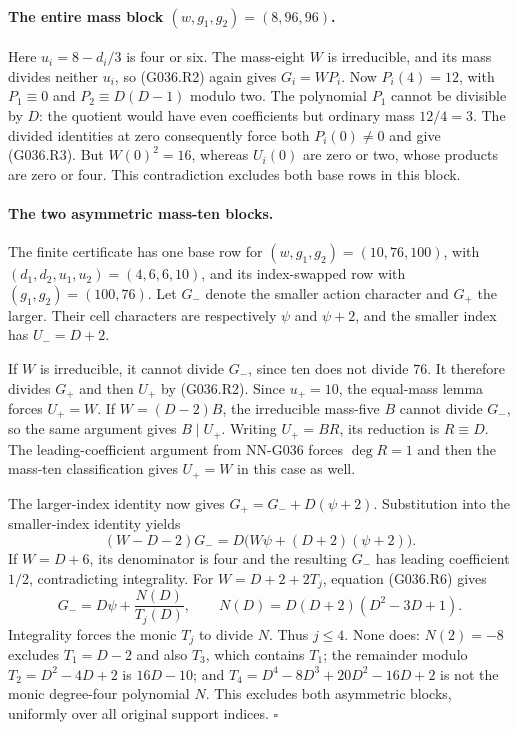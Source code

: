 \paragraph{The entire mass block $(w,g_1,g_2)=(8,96,96)$.}
Here $u_i=8-d_i/3$ is four or six.
The mass-eight $W$ is irreducible, and its mass
divides neither $u_i$, so (G036.R2) again gives
$G_i=WP_i$. Now $P_i(4)=12$, with
$P_1\equiv0$ and $P_2\equiv D(D-1)$ modulo two.
The polynomial $P_1$ cannot be divisible by $D$:
the quotient would have even coefficients but
ordinary mass $12/4=3$.
The divided identities at zero consequently
force both $P_i(0)\ne0$ and give (G036.R3).
But $W(0)^2=16$, whereas $U_i(0)$ are zero or two,
whose products are zero or four. This contradiction
excludes both base rows in this block.

\paragraph{The two asymmetric mass-ten blocks.}
The finite certificate has one base row for
$(w,g_1,g_2)=(10,76,100)$, with
$(d_1,d_2,u_1,u_2)=(4,6,6,10)$, and its index-swapped
row with $(g_1,g_2)=(100,76)$.
Let $G_-$ denote the smaller action character and
$G_+$ the larger. Their cell characters are
respectively $\psi$ and $\psi+2$, and the smaller
index has $U_-=D+2$.

If $W$ is irreducible, it cannot divide $G_-$,
since ten does not divide $76$.
It therefore divides $G_+$ and then $U_+$ by
(G036.R2). Since $u_+=10$, the equal-mass lemma
forces $U_+=W$.
If $W=(D-2)B$, the irreducible mass-five $B$ cannot
divide $G_-$, so the same argument gives $B\mid U_+$.
Writing $U_+=BR$, its reduction is $R\equiv D$.
The leading-coefficient argument from NN-G036 forces
$\deg R=1$ and then the mass-ten classification gives
$U_+=W$ in this case as well.

The larger-index identity now gives
$G_+=G_-+D(\psi+2)$.
Substitution into the smaller-index identity yields
\[
 (W-D-2)G_-=D\bigl(W\psi+(D+2)(\psi+2)\bigr).       \tag{G036.R6}
\]
If $W=D+6$, its denominator is four and the resulting
$G_-$ has leading coefficient $1/2$, contradicting
integrality.
For $W=D+2+2T_j$, equation (G036.R6) gives
\[
 G_-=D\psi+\frac{N(D)}{T_j(D)},\qquad
 N(D)=D(D+2)(D^2-3D+1).
\]
Integrality forces the monic $T_j$ to divide $N$.
Thus $j\le4$. None does:
$N(2)=-8$ excludes $T_1=D-2$ and also $T_3$,
which contains $T_1$;
the remainder modulo $T_2=D^2-4D+2$ is $16D-10$;
and $T_4=D^4-8D^3+20D^2-16D+2$ is not the
monic degree-four polynomial $N$.
This excludes both asymmetric blocks, uniformly
over all original support indices.
\hfill$\square$

